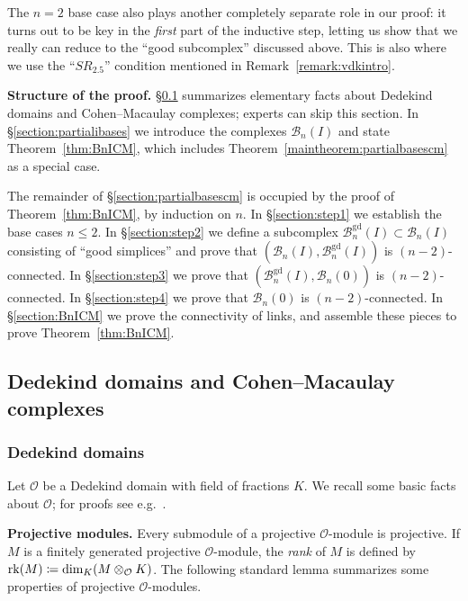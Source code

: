 \documentclass[11 pt]{article}
\theoremstyle{plain}
\theoremstyle{definition}
\numberwithin{equation}{section}
\newcommand{\para}[1]{\bigskip\noindent\textbf{#1.}}
\renewcommand{\O}{\mathcal{O}}
\newcommand\PartialBases{\ensuremath{\mathcal{B}}}
\newcommand{\PB}{\PartialBases}
\newcommand{\PartialBasesGood}{\PartialBases^{\text{gd}}}
\newcommand{\PBg}{\PartialBasesGood}
\newcommand\coloneq{\mathrel{\mathop:}\mkern-1.2mu=}
\DeclareMathOperator{\Rank}{rk}
\begin{document}
\smallskip
The $n=2$ base case also plays another completely separate role in our proof: it turns out to be  key in the \emph{first} part of the inductive step, letting us show that we really can reduce to the ``good subcomplex'' discussed above. This is also where we use the ``$SR_{2.5}$'' condition mentioned in Remark~\ref{remark:vdkintro}.


\para{Structure of the proof} \S\ref{section:basics} summarizes elementary facts about Dedekind domains and Cohen--Macaulay complexes; experts can skip this section. 
In \S\ref{section:partialibases} we introduce the complexes $\PB_n(I)$ and state Theorem~\ref{thm:BnICM}, which includes Theorem~\ref{maintheorem:partialbasescm} as a special case.

The remainder of \S\ref{section:partialbasescm} is occupied by the proof of Theorem~\ref{thm:BnICM}, by induction on $n$.
In \S\ref{section:step1} we establish
the base cases $n \leq 2$.
In \S\ref{section:step2} we define a subcomplex $\PartialBasesGood_n(I) \subset \PartialBases_n(I)$
consisting of ``good simplices'' and prove that
$(\PB_n(I),\PBg_n(I))$ is $(n-2)$-connected.
In \S\ref{section:step3} we prove that $(\PBg_n(I),\PB_n(0))$ is $(n-2)$-connected.
In \S\ref{section:step4} we prove that $\PB_n(0)$ is $(n-2)$-connected.
In \S\ref{section:BnICM} we prove the connectivity of links, and
assemble these pieces to prove Theorem~\ref{thm:BnICM}.

\subsection{Dedekind domains and Cohen--Macaulay complexes}
\label{section:basics}

\subsubsection{Dedekind domains}

Let $\O$ be a Dedekind domain with field of fractions $K$. We recall some basic facts
about $\O$; for proofs see e.g.\ \cite{MilnorKtheory}.

\para{Projective modules}
Every submodule of a projective $\O$-module is 
projective. %
If $M$ is a finitely generated projective $\O$-module, the \emph{rank} of $M$ is defined by 
$\Rank(M)\coloneq \dim_K(M \otimes_\O K)$.  The following standard lemma summarizes
some properties of projective $\O$-modules.
\end{document}
